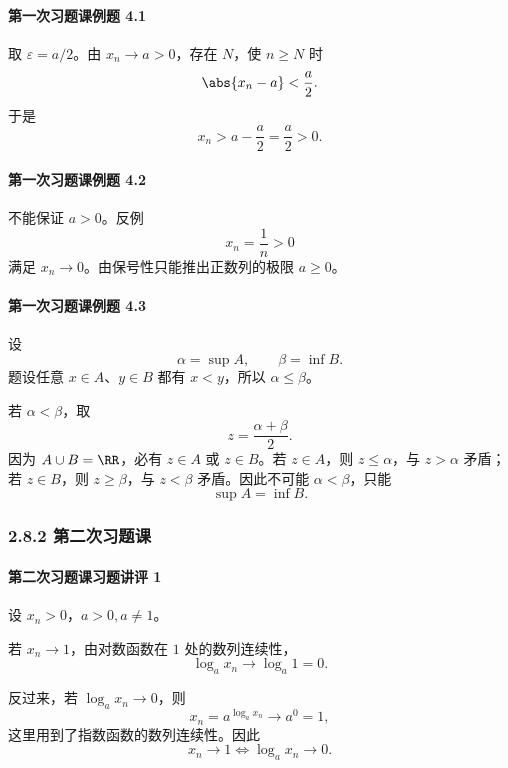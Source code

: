 \paragraph{第一次习题课例题 4.1}
\begin{xsolution}
取 $\varepsilon=a/2$。由 $x_n\to a>0$，存在 $N$，使 $n\ge N$ 时
\[
  \abs{x_n-a}<\frac a2.
\]
于是
\[
  x_n>a-\frac a2=\frac a2>0.
\]
\end{xsolution}

\paragraph{第一次习题课例题 4.2}
\begin{xsolution}
不能保证 $a>0$。反例
\[
  x_n=\frac1n>0
\]
满足 $x_n\to0$。由保号性只能推出正数列的极限 $a\ge0$。
\end{xsolution}

\paragraph{第一次习题课例题 4.3}
\begin{xsolution}
设
\[
  \alpha=\sup A,\qquad\beta=\inf B.
\]
题设任意 $x\in A$、$y\in B$ 都有 $x<y$，所以 $\alpha\le\beta$。

若 $\alpha<\beta$，取
\[
  z=\frac{\alpha+\beta}{2}.
\]
因为 $A\cup B=\RR$，必有 $z\in A$ 或 $z\in B$。若 $z\in A$，则 $z\le\alpha$，与 $z>\alpha$ 矛盾；若 $z\in B$，则 $z\ge\beta$，与 $z<\beta$ 矛盾。因此不可能 $\alpha<\beta$，只能
\[
  \boxed{\sup A=\inf B}.
\]
\end{xsolution}

\subsubsection*{2.8.2 第二次习题课}

\paragraph{第二次习题课习题讲评 1}
\begin{xsolution}
设 $x_n>0$，$a>0,a\ne1$。

若 $x_n\to1$，由对数函数在 $1$ 处的数列连续性，
\[
  \log_ax_n\to\log_a1=0.
\]

反过来，若 $\log_ax_n\to0$，则
\[
  x_n=a^{\log_ax_n}\to a^0=1,
\]
这里用到了指数函数的数列连续性。因此
\[
  \boxed{x_n\to1\Longleftrightarrow\log_ax_n\to0}.
\]
\end{xsolution}

